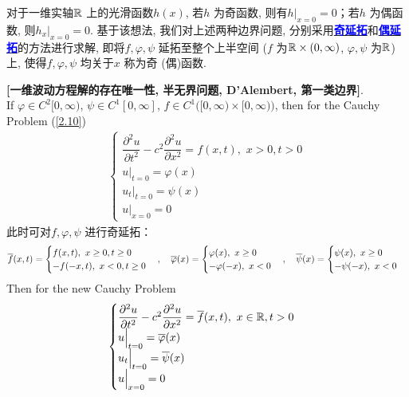 	\vspace*{2em}
	
	\hspace*{-1.95em}对于一维实轴$\mathbb{R}$ 上的光滑函数$h(x)$, 若$h$ 为奇函数, 则有$h \Big|_{x = 0} = 0$；若$h$ 为偶函数, 则$h_x \Big|_{x = 0} = 0$. 基于该想法, 我们对上述两种边界问题, 分别采用\underline{\textcolor{blue}{\textbf{奇延拓}}}和\underline{\textcolor{blue}{\textbf{偶延拓}}}的方法进行求解, 即将$f , \varphi , \psi$ 延拓至整个上半空间 ($f$ 为$\mathbb{R} \times (0 , \infty)$, $\varphi , \psi$ 为$\mathbb{R}$)上, 使得$f , \varphi , \psi$ 均关于$x$ 称为奇 (偶)函数. 
	
	\newpage
	
	\begin{thm}\label{thm 2.3.3}
		\textbf{[一维波动方程解的存在唯一性, 半无界问题, D'Alembert, 第一类边界]}. \\
		If $\varphi \in C^2[0 , \infty)$, $\psi \in C^1[0 , \infty]$, $f \in C^1 \Big( [0 , \infty) \times [0 , \infty) \Big)$, then for the Cauchy Problem (\ref{2.10})
		\begin{align*}
			\begin{cases}
				\dfrac{\partial^2 u}{\partial t^2} - c^2 \dfrac{\partial^2 u}{\partial x^2} = f(x , t) , \,\, x > 0 , t > 0 \\
				u \Big|_{t = 0} = \varphi(x) \\
				u_t \Big|_{t = 0} = \psi(x) \\
				u \Big|_{x = 0} = 0
			\end{cases}
		\end{align*}
		此时可对$f , \varphi , \psi$ 进行奇延拓：
		\begin{align*}
			\overline{f}(x , t) = 
			\begin{cases}
				f(x  ,t) , \,\, x \geq 0 , t \geq 0 \\
				-f(-x , t) , \,\, x < 0 , t \geq 0
			\end{cases} , \hspace*{1em}
			\overline{\varphi}(x) = 
			\begin{cases}
				\varphi(x) , \,\, x \geq 0 \\
				-\varphi(-x) , \,\, x < 0
			\end{cases} , \hspace*{1em}
			\overline{\psi}(x) = 
			\begin{cases}
				\psi(x) , \,\, x \geq 0 \\
				-\psi(-x) , \,\, x < 0
			\end{cases}
		\end{align*}
		Then for the new Cauchy Problem
		\begin{align*}
			\begin{cases}
				\dfrac{\partial^2 u}{\partial t^2} - c^2 \dfrac{\partial^2 u}{\partial x^2} = \overline{f}(x , t) , \,\, x \in \mathbb{R} , t > 0 \\
				u \Big|_{t = 0} = \overline{\varphi}(x) \\
				u_t \Big|_{t = 0} = \overline{\psi}(x) \\
				u \Big|_{x = 0} = 0
			\end{cases}
		\end{align*}
		

\end{thm}
